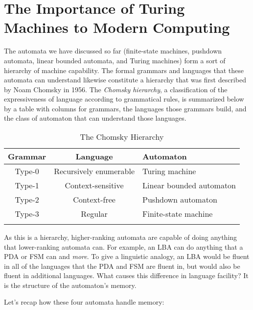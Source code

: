 \section{The Importance of Turing Machines to Modern Computing}

The automata we have discussed so far (finite-state machines, pushdown automata, linear bounded automata, and Turing machines) form a sort of hierarchy of machine capability. The formal grammars and languages that these automata can understand likewise constitute a hierarchy that was first described by Noam Chomsky in 1956. The \textit{Chomsky hierarchy}, a classification of the expressiveness of language according to grammatical rules, is summarized below by a table with columns for grammars, the languages those grammars build, and the class of automaton that can understand those languages.

\begin{table}[H]
    \caption{The Chomsky Hierarchy}
    \label{tab:LABEL}
    \begin{tabularx}{\textwidth}{|c|c|Y|}
        \hline
        Grammar & Language & Automaton \\
        \hline
        Type-0 & Recursively enumerable & Turing machine \\
        Type-1 & Context-sensitive & Linear bounded automaton \\
        Type-2 & Context-free & Pushdown automaton \\
        Type-3 & Regular & Finite-state machine \\
        \hline
    \end{tabularx}
\end{table}

As this is a hierarchy, higher-ranking automata are capable of doing anything that lower-ranking automata can. For example, an LBA can do anything that a PDA or FSM can and \textit{more}. To give a linguistic analogy, an LBA would be fluent in all of the languages that the PDA and FSM are fluent in, but would also be fluent in additional languages. What causes this difference in language facility? It is the structure of the automaton's memory.

Let's recap how these four automata handle memory:

